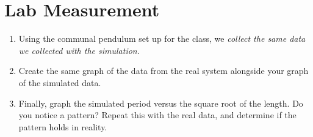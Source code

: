 \documentclass{article}
\begin{document}
\section{Lab Measurement}

\begin{enumerate}
\item Using the communal pendulum set up for the class, we \textit{collect the same data we collected with the simulation.}
\item Create the same graph of the data from the real system alongside your graph of the simulated data.
\item Finally, graph the simulated period versus the square root of the length.  Do you notice a pattern?  Repeat this with the real data, and determine if the pattern holds in reality.
\end{enumerate}
\end{document}
